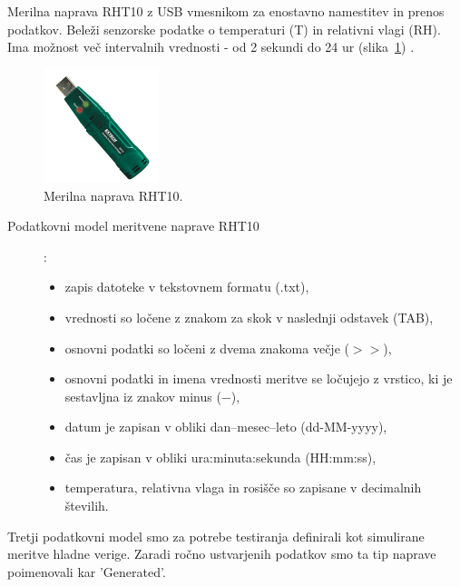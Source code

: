 \documentclass[a4paper, 12pt]{book}
\begin{document}
\clearpage

Merilna naprava RHT10 z USB vmesnikom za enostavno namestitev in prenos podatkov. Beleži senzorske podatke o temperaturi (T) in relativni vlagi (RH). 
Ima možnost več intervalnih vrednosti - od 2 sekundi do 24 ur (slika~\ref{merilna-naprava-rht10}) \cite{rht10-dialogger}.

\begin{figure}[h]
\begin{center}
\includegraphics[width=0.3\textwidth]{slike/merilna-naprava-rht10.png}
\end{center}
\caption{Merilna naprava RHT10.}
\label{merilna-naprava-rht10}
\end{figure}

\begin{description}
\item[Podatkovni model meritvene naprave RHT10]:
\begin{itemize}
\item zapis datoteke v tekstovnem formatu (.txt),
\item vrednosti so ločene z znakom za skok v naslednji odstavek (TAB),
\item osnovni podatki so ločeni z dvema znakoma večje ($>>$),
\item osnovni podatki in imena vrednosti meritve se ločujejo z vrstico, ki je sestavljna iz znakov minus ($-$),
\item datum je zapisan v obliki dan--mesec--leto (dd-MM-yyyy),
\item čas je zapisan v obliki ura:minuta:sekunda (HH:mm:ss),
\item temperatura, relativna vlaga in rosišče so zapisane v decimalnih številih.
\end{itemize}
\end{description}


\clearpage

\noindent Tretji podatkovni model smo za potrebe testiranja definirali kot simulirane meritve hladne verige. Zaradi ročno ustvarjenih podatkov smo ta tip naprave poimenovali kar 'Generated'.
\end{document}
